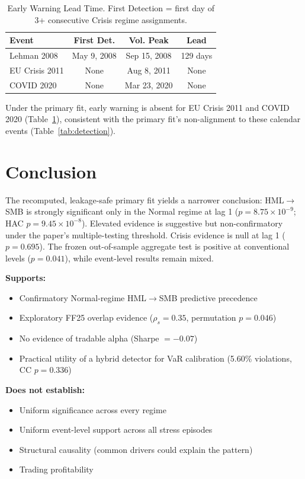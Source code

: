 \documentclass{uai2026}
\begin{document}
\begin{table}[t]
\centering
\caption{Early Warning Lead Time. First Detection = first day of 3+ consecutive
Crisis regime assignments.}
\label{tab:warning}
\scriptsize
\begin{tabular}{@{}lccc@{}}
\toprule
Event & First Det. & Vol. Peak & Lead \\
\midrule
Lehman 2008 & May 9, 2008 & Sep 15, 2008 & 129 days \\
EU Crisis 2011 & None & Aug 8, 2011 & None \\
COVID 2020 & None & Mar 23, 2020 & None \\
\bottomrule
\end{tabular}
\end{table}

Under the primary fit, early warning is absent for EU Crisis 2011 and COVID 2020
(Table~\ref{tab:warning}), consistent with the primary fit's non-alignment to these
calendar events (Table~\ref{tab:detection}).

\section{Conclusion}

The recomputed, leakage-safe primary fit yields a narrower conclusion: HML$\to$SMB is
strongly significant only in the Normal regime at lag 1 ($p = 8.75 \times 10^{-9}$;
HAC $p = 9.45 \times 10^{-8}$). Elevated evidence is suggestive but
non-confirmatory under the paper's multiple-testing threshold. Crisis evidence is null
at lag 1 ($p = 0.695$). The frozen out-of-sample aggregate test is positive at
conventional levels ($p = 0.041$), while event-level results remain mixed.

\textbf{Supports:}
\begin{itemize}
    \item Confirmatory Normal-regime HML$\to$SMB predictive precedence
    \item Exploratory FF25 overlap evidence ($\rho_s = 0.35$, permutation $p = 0.046$)
    \item No evidence of tradable alpha (Sharpe $= -0.07$)
    \item Practical utility of a hybrid detector for VaR calibration
    (5.60\% violations, CC $p = 0.336$)
\end{itemize}

\textbf{Does not establish:}
\begin{itemize}
    \item Uniform significance across every regime
    \item Uniform event-level support across all stress episodes
    \item Structural causality (common drivers could explain the pattern)
    \item Trading profitability
\end{itemize}
\end{document}
